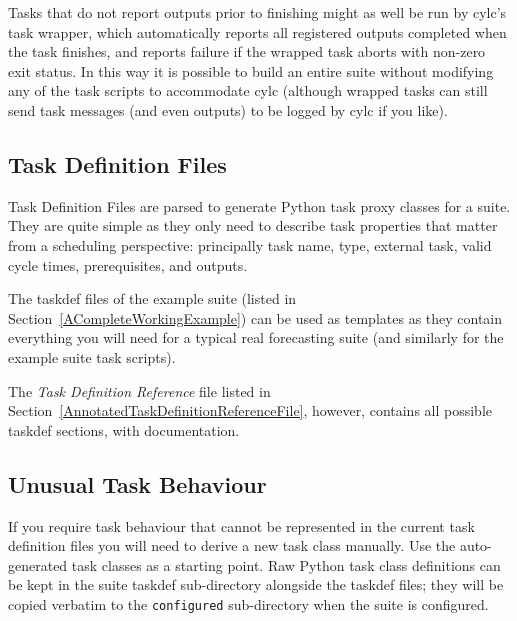 \documentclass[11pt,a4paper]{article}
\begin{document}
Tasks that do not report outputs prior to finishing might as well be 
run by cylc's task wrapper, which automatically reports all registered 
outputs completed when the task finishes, and reports failure if the
wrapped task aborts with non-zero exit status. In this way it is
possible to build an entire suite without modifying any of the task
scripts to accommodate cylc (although wrapped tasks can still send 
task messages (and even outputs) to be logged by cylc if you like).

\subsection{Task Definition Files} 
\label{TaskDefinitionFiles}

Task Definition Files are parsed to generate Python task proxy
classes for a suite. They are quite simple as they only need to 
describe task properties that matter from a scheduling perspective:
principally task name, type, external task, valid cycle times,
prerequisites, and outputs.  

The taskdef files of the example suite (listed in
Section~\ref{ACompleteWorkingExample}) can be used as templates as they
contain everything you will need for a typical real forecasting suite 
(and similarly for the example suite task scripts).

The {\em Task Definition Reference} file listed in
Section~\ref{AnnotatedTaskDefinitionReferenceFile}, however, contains
all possible taskdef sections, with documentation.


\subsection{Unusual Task Behaviour}
\label{UnusualTaskBehaviour}

If you require task behaviour that cannot be represented in the current 
task definition files you will need to derive a new task class manually.
Use the auto-generated task classes as a starting point. Raw Python 
task class definitions can be kept in the suite taskdef sub-directory
alongside the taskdef files; they will be copied verbatim to the
\lstinline=configured= sub-directory when the suite is configured.
\end{document}
